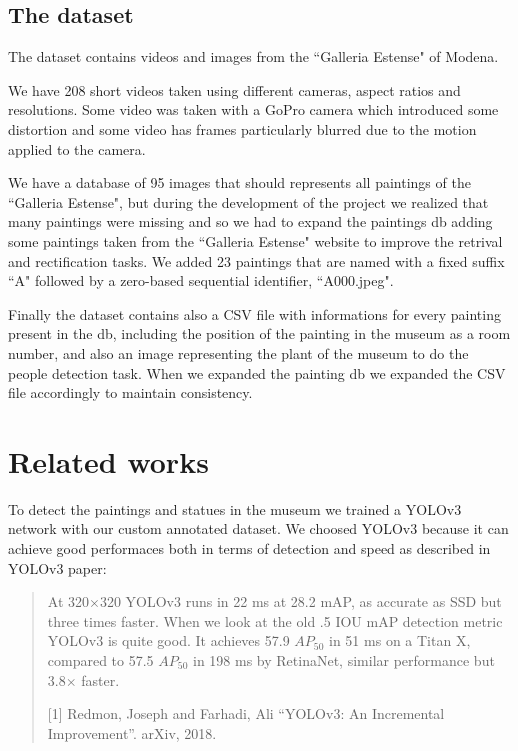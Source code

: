 \documentclass[10pt,twocolumn,letterpaper]{article}
\begin{document}
\subsection{The dataset}

The dataset contains videos and images from the ``Galleria Estense" of Modena.

We have 208 short videos taken using different cameras, aspect ratios and resolutions. 
Some video was taken with a GoPro camera which introduced some distortion and
some video has frames particularly blurred due to the motion applied to the camera.

We have a database of 95 images that should represents all paintings of the ``Galleria Estense", 
but during the development of the project we realized that many paintings were missing 
and so we had to expand the paintings db adding some paintings taken from the ``Galleria Estense" 
website to improve the retrival and rectification tasks. We added 23 paintings that are named 
with a fixed suffix ``A" followed by a zero-based sequential identifier, \eg ``A000.jpeg".

Finally the dataset contains also a CSV file with informations for every painting present
in the db, including the position of the painting in the museum as a room number, and also an image
representing the plant of the museum to do the people detection task. When we expanded the 
painting db we expanded the CSV file accordingly to maintain consistency.

\section{Related works}

To detect the paintings and statues in the museum we trained a YOLOv3 network with
our custom annotated dataset. We choosed YOLOv3 because it can achieve good performaces
both in terms of detection and speed as described in YOLOv3 paper:
\begin{quote}
   At 320$\times$320 YOLOv3 runs in 22 ms at 28.2 mAP, as accurate as SSD but three times faster. 
   When we look at the old .5 IOU mAP detection metric YOLOv3 is quite good. It achieves
   57.9 $AP_{50}$ in 51 ms on a Titan X, compared to 57.5 $AP_{50}$ in 198 ms by RetinaNet,
   similar performance but 3.8$\times$ faster.

   [1] Redmon, Joseph and Farhadi, Ali 
   ``YOLOv3: An Incremental Improvement''.
   arXiv, 2018.
\end{quote}
\end{document}

